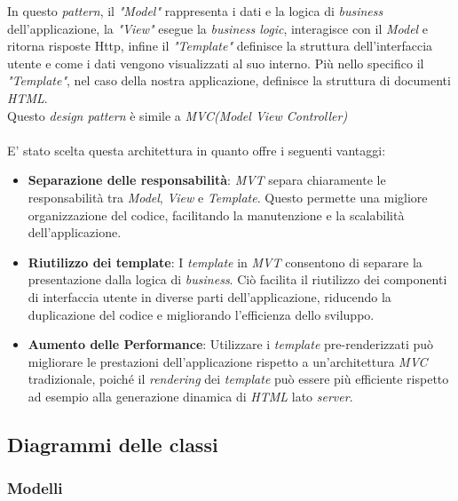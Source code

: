 \documentclass[5pt]{article}
\begin{document}
In questo \textit{pattern}, il \textit{"Model"} rappresenta i dati e la logica di \textit{business} dell'applicazione, la \textit{"View"} esegue la \textit{business logic}, interagisce con il \textit{Model} e ritorna risposte Http, infine  il \textit{"Template"} definisce la struttura dell'interfaccia utente e come i dati vengono visualizzati al suo interno. Più nello specifico il \textit{"Template"}, nel caso della nostra applicazione, definisce la struttura di documenti \textit{HTML}.\\

Questo \textit{design pattern} è simile a \textit{MVC(Model View Controller)} \\\\
E' stato scelta questa architettura in quanto offre i seguenti vantaggi:
\begin{itemize}
    \item \textbf{Separazione delle responsabilità}: \textit{MVT} separa chiaramente le responsabilità tra \textit{Model}, \textit{View} e \textit{Template}. Questo permette una migliore organizzazione del codice, facilitando la manutenzione e la scalabilità dell'applicazione.

    \item \textbf{Riutilizzo dei template}: I \textit{template} in \textit{MVT} consentono di separare la presentazione dalla logica di \textit{business}. Ciò facilita il riutilizzo dei componenti di interfaccia utente in diverse parti dell'applicazione, riducendo la duplicazione del codice e migliorando l'efficienza dello sviluppo.

    \item \textbf{Aumento delle Performance}: Utilizzare i \textit{template} pre-renderizzati può migliorare le prestazioni dell'applicazione rispetto a un'architettura \textit{MVC} tradizionale, poiché il \textit{rendering} dei \textit{template} può essere più efficiente rispetto ad esempio alla generazione dinamica di \textit{HTML} lato \textit{server}.

\end{itemize}
	
	\subsection{Diagrammi delle classi}
	
	\subsubsection{Modelli}
	
\end{document}
